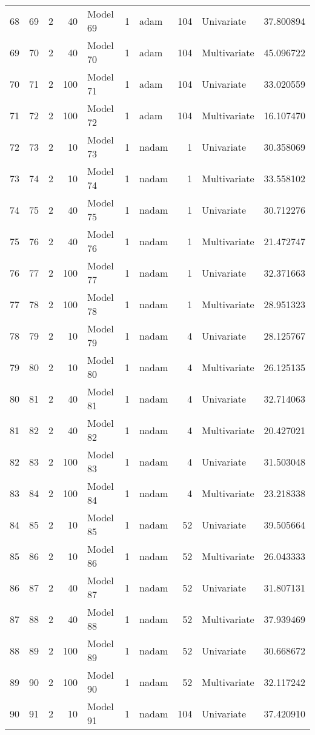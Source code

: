 \begin{tabular}{lrrrlrlrlr}
68 & 69 & 2 & 40 & Model 69 & 1 & adam & 104 & Univariate & 37.800894 \\
69 & 70 & 2 & 40 & Model 70 & 1 & adam & 104 & Multivariate & 45.096722 \\
70 & 71 & 2 & 100 & Model 71 & 1 & adam & 104 & Univariate & 33.020559 \\
71 & 72 & 2 & 100 & Model 72 & 1 & adam & 104 & Multivariate & 16.107470 \\
72 & 73 & 2 & 10 & Model 73 & 1 & nadam & 1 & Univariate & 30.358069 \\
73 & 74 & 2 & 10 & Model 74 & 1 & nadam & 1 & Multivariate & 33.558102 \\
74 & 75 & 2 & 40 & Model 75 & 1 & nadam & 1 & Univariate & 30.712276 \\
75 & 76 & 2 & 40 & Model 76 & 1 & nadam & 1 & Multivariate & 21.472747 \\
76 & 77 & 2 & 100 & Model 77 & 1 & nadam & 1 & Univariate & 32.371663 \\
77 & 78 & 2 & 100 & Model 78 & 1 & nadam & 1 & Multivariate & 28.951323 \\
78 & 79 & 2 & 10 & Model 79 & 1 & nadam & 4 & Univariate & 28.125767 \\
79 & 80 & 2 & 10 & Model 80 & 1 & nadam & 4 & Multivariate & 26.125135 \\
80 & 81 & 2 & 40 & Model 81 & 1 & nadam & 4 & Univariate & 32.714063 \\
81 & 82 & 2 & 40 & Model 82 & 1 & nadam & 4 & Multivariate & 20.427021 \\
82 & 83 & 2 & 100 & Model 83 & 1 & nadam & 4 & Univariate & 31.503048 \\
83 & 84 & 2 & 100 & Model 84 & 1 & nadam & 4 & Multivariate & 23.218338 \\
84 & 85 & 2 & 10 & Model 85 & 1 & nadam & 52 & Univariate & 39.505664 \\
85 & 86 & 2 & 10 & Model 86 & 1 & nadam & 52 & Multivariate & 26.043333 \\
86 & 87 & 2 & 40 & Model 87 & 1 & nadam & 52 & Univariate & 31.807131 \\
87 & 88 & 2 & 40 & Model 88 & 1 & nadam & 52 & Multivariate & 37.939469 \\
88 & 89 & 2 & 100 & Model 89 & 1 & nadam & 52 & Univariate & 30.668672 \\
89 & 90 & 2 & 100 & Model 90 & 1 & nadam & 52 & Multivariate & 32.117242 \\
90 & 91 & 2 & 10 & Model 91 & 1 & nadam & 104 & Univariate & 37.420910 \\

\end{tabular}
